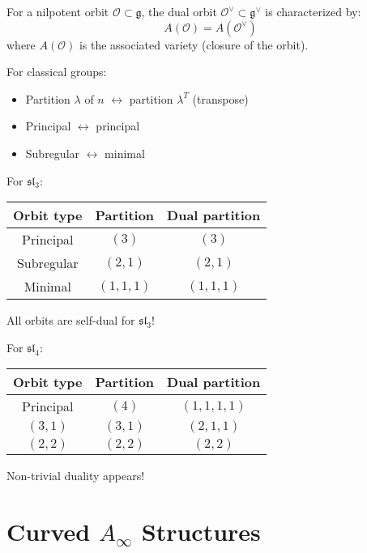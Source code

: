 \begin{definition}
For a nilpotent orbit $\mathcal{O} \subset \mathfrak{g}$, the dual orbit $\mathcal{O}^\vee \subset \mathfrak{g}^\vee$ is characterized by:
\begin{equation}
A(\mathcal{O}) = A(\mathcal{O}^\vee)
\end{equation}
where $A(\mathcal{O})$ is the associated variety (closure of the orbit).

For classical groups:
\begin{itemize}
\item Partition $\lambda$ of $n$ $\leftrightarrow$ partition $\lambda^T$ (transpose)
\item Principal $\leftrightarrow$ principal
\item Subregular $\leftrightarrow$ minimal
\end{itemize}
\end{definition}

\begin{example}
For $\mathfrak{sl}_3$:
\begin{center}
\begin{tabular}{c|c|c}
Orbit type & Partition & Dual partition \\
\hline
Principal & $(3)$ & $(3)$ \\
Subregular & $(2,1)$ & $(2,1)$ \\
Minimal & $(1,1,1)$ & $(1,1,1)$
\end{tabular}
\end{center}

All orbits are self-dual for $\mathfrak{sl}_3$!

For $\mathfrak{sl}_4$:
\begin{center}
\begin{tabular}{c|c|c}
Orbit type & Partition & Dual partition \\
\hline
Principal & $(4)$ & $(1,1,1,1)$ \\
$(3,1)$ & $(3,1)$ & $(2,1,1)$ \\
$(2,2)$ & $(2,2)$ & $(2,2)$
\end{tabular}
\end{center}

Non-trivial duality appears!
\end{example}

\section{Curved $A_\infty$ Structures}

